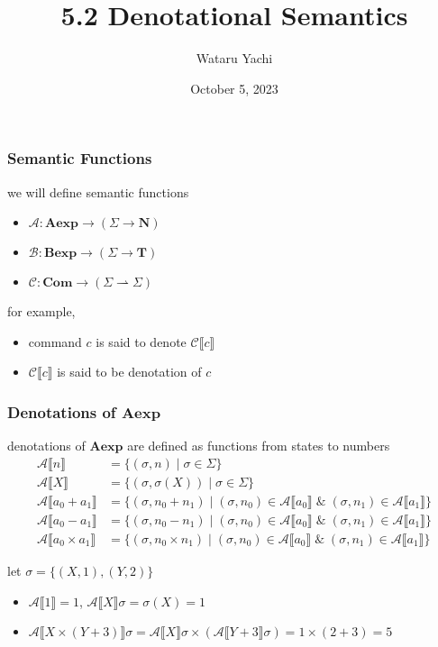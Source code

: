 \documentclass[12pt,aspectratio=169]{beamer}
\title{5.2 Denotational Semantics}
\author{Wataru Yachi}
\institute{JAIST}
\date{October 5, 2023}
\newcommand{\Aexp}{\mathbf{Aexp}}
\newcommand{\Bexp}{\mathbf{Bexp}}
\newcommand{\Com}{\mathbf{Com}}
\newcommand{\denoA}[1]{\mathcal{A} \llbracket #1 \rrbracket}
\newcommand{\denoC}[1]{\mathcal{C} \llbracket #1 \rrbracket}
\begin{document}
\maketitle

\begin{frame}
    \frametitle{Semantic Functions}
    
    we will define semantic functions

    \begin{itemize}
        \item $\mathcal{A}:\Aexp \rightarrow (\Sigma \rightarrow \mathbf{N})$
        \item $\mathcal{B}:\Bexp \rightarrow (\Sigma \rightarrow \mathbf{T})$
        \item $\mathcal{C}:\Com \rightarrow (\Sigma \rightharpoonup \Sigma)$
    \end{itemize}

    \pause
    \bigskip

    for example,
    \begin{itemize}
        \item command $c$ is said to \alert{denote} $\denoC{c}$
        \item $\denoC{c}$ is said to be \alert{denotation} of $c$
    \end{itemize}
\end{frame}

\begin{frame}
    \frametitle{Denotations of $\Aexp$}
    denotations of $\Aexp$ are defined as functions from states to numbers
        \begin{align*}
            \denoA{n} & = \{(\sigma,n) \mid \sigma \in \Sigma \}\\
            \denoA{X} & = \{ (\sigma, \sigma(X)) \mid \sigma \in \Sigma \}\\
            \denoA{a_0 + a_1} & = \{(\sigma, n_0 + n_1) \mid
                (\sigma, n_0) \in \denoA{a_0} \; \& \; (\sigma, n_1) \in \denoA{a_1}\}\\
            \denoA{a_0 - a_1} & = \{(\sigma, n_0 - n_1) \mid
                (\sigma, n_0) \in \denoA{a_0} \; \& \; (\sigma, n_1) \in \denoA{a_1}\}\\
            \denoA{a_0 \times a_1} & = \{(\sigma, n_0 \times n_1) \mid
                (\sigma, n_0) \in \denoA{a_0} \; \& \; (\sigma, n_1) \in \denoA{a_1}\}
        \end{align*}
        \vspace{-10mm}
        \pause
    \begin{example}
        let $\sigma = \{(X,1),(Y,2)\}$
        \begin{itemize}[<+->]
            \item $\denoA{1} = 1$, \pause $\denoA{X}\sigma = \sigma(X) = 1$
            \item $\denoA{X \times (Y + 3)}\sigma = \denoA{X}\sigma \times (\denoA{Y + 3}\sigma) = 1 \times (2 + 3) = 5$
        \end{itemize}
    \end{example}
\end{frame}
\end{document}
